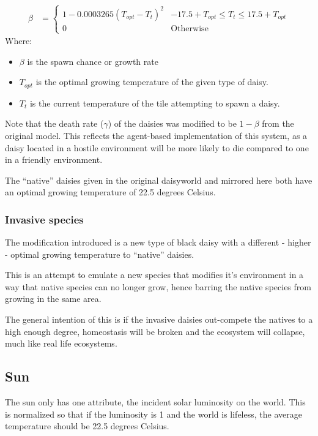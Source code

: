 \documentclass[12pt]{article}
\begin{document}
\begin{align}
  \beta &=
  \begin{cases}
    1 - 0.0003265(T_{opt} - T_t)^2 & -17.5+T_{opt}\leq T_t \leq 17.5+T_{opt}\\
    0 & \mathrm{Otherwise}
  \end{cases}
\end{align}
Where:
\begin{itemize}
\item $\beta$ is the spawn chance or growth rate
\item $T_{opt}$ is the optimal growing temperature of the given type
  of daisy.
\item $T_t$ is the current temperature of the tile attempting to spawn
  a daisy.
\end{itemize}

Note that the death rate ($\gamma$) of the daisies was modified to be
$1-\beta$ from the original model. This reflects the agent-based
implementation of this system, as a daisy located in a hostile
environment will be more likely to die compared to one in a friendly
environment.

The ``native'' daisies given in the original daisyworld and mirrored
here both have an optimal growing temperature of 22.5 degrees Celsius.

\subsubsection{Invasive species}
The modification introduced is a new type of black daisy with a
different - higher - optimal growing temperature to ``native''
daisies.

This is an attempt to emulate a new species that modifies it's
environment in a way that native species can no longer grow, hence
barring the native species from growing in the same area.

The general intention of this is if the invasive daisies out-compete
the natives to a high enough degree, homeostasis will be broken and
the ecosystem will collapse, much like real life ecosystems.

\subsection{Sun}
The sun only has one attribute, the incident solar luminosity on the
world. This is normalized so that if the luminosity is 1 and the world
is lifeless, the average temperature should be 22.5 degrees Celsius.
\end{document}
